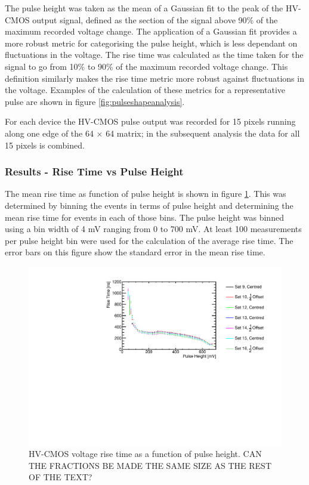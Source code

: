 The pulse height was taken as the mean of a Gaussian fit to the peak of the HV-CMOS output signal, defined as the section of the signal above 90\% of the maximum recorded voltage change.  The application of a Gaussian fit provides a more robust metric for categorising the pulse height, which is less dependant on fluctuations in the voltage.  The rise time was calculated as the time taken for the signal to go from 10\% to 90\% of the maximum recorded voltage change.  This definition similarly makes the rise time metric more robust against fluctuations in the voltage.  Examples of the calculation of these metrics for a representative pulse are shown in figure \ref{fig:pulseshapeanalysis}.

For each device the HV-CMOS pulse output was recorded for 15 pixels running along one edge of the 64 $\times$ 64 matrix; in the subsequent analysis the data for all 15 pixels is combined.


\subsubsection{Results -  Rise Time vs Pulse Height}
\label{sec:resultsrisetimepulseheight}
The mean rise time as function of pulse height is shown in figure \ref{fig:risetime}.  This was determined by binning the events in terms of pulse height and determining the mean rise time for events in each of those bins.  The pulse height was binned using a bin width of 4 mV ranging from 0 to 700 mV.  At least 100 measurements per pulse height bin were used for the calculation of the average rise time.  The error bars on this figure show the standard error in the mean rise time.  

\begin{figure}
\centering
\includegraphics[width=1.0\textwidth]{CLICdpVertex/Plots/RadSourceAnalysis/AllSETs_RiseTime_PulseHeight.pdf}
\caption[HV-CMOS voltage rise time as a function of pulse height.]{HV-CMOS voltage rise time as a function of pulse height. CAN THE FRACTIONS BE MADE THE SAME SIZE AS THE REST OF THE TEXT? }
\label{fig:risetime}
\end{figure}
 
